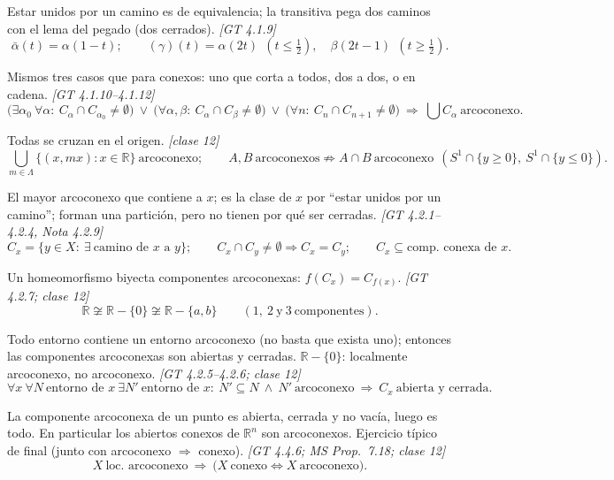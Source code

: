 \documentclass[11pt,a4paper]{article}
\theoremstyle{definition}
\theoremstyle{plain}
\newcommand{\fnt}[1]{{\normalfont\small\itshape\color{gray!150!black}[#1]}}
\newcommand{\R}{\mathbb{R}}
\begin{document}
\begin{itemize}[leftmargin=1.3em,itemsep=3pt]
 Estar unidos por un camino es de equivalencia; la transitiva pega dos caminos con el lema del pegado (dos cerrados). \fnt{GT 4.1.9}
\[ \bar\alpha(t)=\alpha(1-t);\qquad (\gamma)(t)=\alpha(2t)\ \ (t\le\tfrac12),\quad \beta(2t-1)\ \ (t\ge\tfrac12). \]

 Mismos tres casos que para conexos: uno que corta a todos, dos a dos, o en cadena. \fnt{GT 4.1.10--4.1.12}
\[ \big(\exists\alpha_0\ \forall\alpha:\ C_\alpha\cap C_{\alpha_0}\ne\emptyset\big)\ \vee\ \big(\forall\alpha,\beta:\ C_\alpha\cap C_\beta\ne\emptyset\big)\ \vee\ \big(\forall n:\ C_n\cap C_{n+1}\ne\emptyset\big)\ \Rightarrow\ \textstyle\bigcup C_\alpha\ \text{arcoconexo}. \]

 Todas se cruzan en el origen. \fnt{clase 12}
\[ \textstyle\bigcup_{m\in\Lambda}\{(x,mx):x\in\R\}\ \text{arcoconexo};\qquad A,B\ \text{arcoconexos}\not\Rightarrow A\cap B\ \text{arcoconexo}\ \ (S^1\cap\{y\ge0\},\ S^1\cap\{y\le0\}). \]

 El mayor arcoconexo que contiene a $x$; es la clase de $x$ por ``estar unidos por un camino''; forman una partición, pero no tienen por qué ser cerradas. \fnt{GT 4.2.1--4.2.4, Nota 4.2.9}
\[ C_x=\{y\in X:\ \exists\ \text{camino de } x \text{ a } y\};\qquad C_x\cap C_y\ne\emptyset\Rightarrow C_x=C_y;\qquad C_x\subseteq\text{comp.\ conexa de } x. \]

 Un homeomorfismo biyecta componentes arcoconexas: $f(C_x)=C_{f(x)}$. \fnt{GT 4.2.7; clase 12}
\[ \R\not\cong\R-\{0\}\not\cong\R-\{a,b\}\qquad(1,\ 2\ \text{y}\ 3\ \text{componentes}). \]

 Todo entorno contiene un entorno arcoconexo (no basta que exista uno); entonces las componentes arcoconexas son abiertas y cerradas. $\R-\{0\}$: localmente arcoconexo, no arcoconexo. \fnt{GT 4.2.5--4.2.6; clase 12}
\[ \forall x\ \forall N\ \text{entorno de } x\ \exists N'\ \text{entorno de } x:\ N'\subseteq N\ \wedge\ N'\ \text{arcoconexo}\ \Rightarrow\ C_x\ \text{abierta y cerrada}. \]

 La componente arcoconexa de un punto es abierta, cerrada y no vacía, luego es todo. En particular los abiertos conexos de $\R^n$ son arcoconexos. Ejercicio típico de final (junto con arcoconexo $\Rightarrow$ conexo). \fnt{GT 4.4.6; MS Prop.\ 7.18; clase 12}
\[ X\ \text{loc.\ arcoconexo}\ \Rightarrow\ \big(X\ \text{conexo}\iff X\ \text{arcoconexo}\big). \]


\end{itemize}
\end{document}
